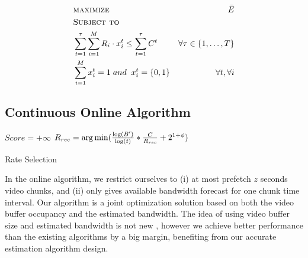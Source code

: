 \begin{subequations}
\begin{align*}
&\textsc{maximize }&\bar{E}\\ 
&\textsc{Subject to}\\
&\sum \limits_{t=1}^\tau  \sum \limits_{i=1}^M R_i \cdot x_i^t\leq\sum\limits_{t=1}^\tau C^t& \forall \tau \in \{1, \dots, T\}\\
&\sum \limits_{i=1}^M x_i^t =1\; and\;\; x_i^t = \{0,1\}&\forall t, \forall i
\end{align*}
\end{subequations}

\subsection{Continuous Online Algorithm} \label{subsec:online}
\begin{algorithm}[ht]
\SetAlgoLined
$Score = +\infty$\;
$ R_{rec}=\operatorname*{arg\,min} (\frac{\log(B')}{\log (t)}*\frac{C}{R_{rec}} +  2^{1+\phi} )$\;

\caption{Rate Selection} \label{cap:algorithm}
\end{algorithm} 

In the online algorithm, we restrict ourselves to (i) at most prefetch $z$ seconds video chunks, and (ii) only gives available bandwidth forecast for one chunk time interval. Our algorithm is a joint optimization solution based on both the video buffer occupancy and the estimated bandwidth. The idea of using video buffer size and estimated bandwidth is not new \cite{BBA, Festive}, however we achieve better performance than the existing algorithms by a big margin, benefiting from our accurate estimation algorithm design. %

